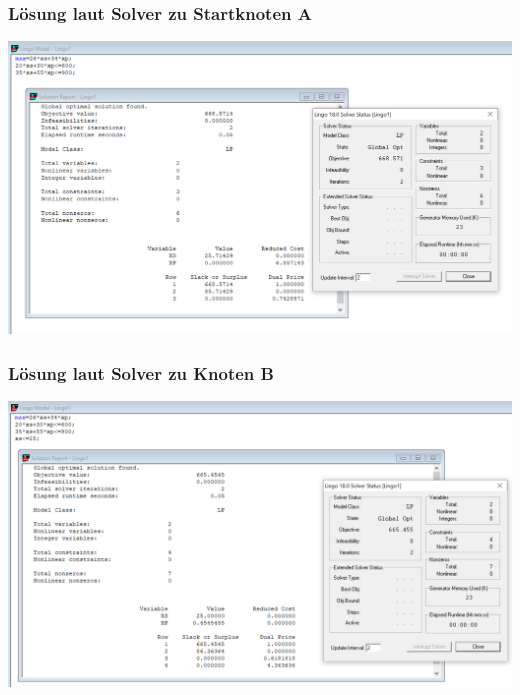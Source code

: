 \documentclass[a4paper,11pt]{article}
\begin{document}
\subsubsection*{Lösung laut Solver zu Startknoten A}
\begin{centering}
	\includegraphics[width=1\linewidth]{src/blatt_5_aufgabe_2_teilaufgabe_b_knoten_a_loesung_solver.png}
\end{centering}

\subsubsection*{Lösung laut Solver zu Knoten B}
\begin{centering}
	\includegraphics[width=1\linewidth]{src/blatt_5_aufgabe_2_teilaufgabe_b_knoten_b_loesung_solver.png}
\end{centering}
\end{document}
